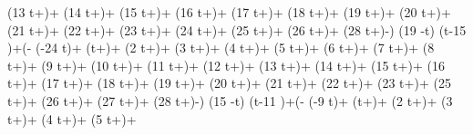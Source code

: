    \sin \left(13 t+\right)+ \sin \left(14
   t+\right)+ \sin \left(15 t+\right)+ \sin
   \left(16 t+\right)+ \sin \left(17
   t+\right)+ \sin \left(18 t+\right)+ \sin
   \left(19 t+\right)+ \sin \left(20 t+\right)+
   \sin \left(21 t+\right)+ \sin \left(22
   t+\right)+ \sin \left(23 t+\right)+ \sin \left(24
   t+\right)+ \sin \left(25 t+\right)+ \sin
   \left(26 t+\right)+ \sin \left(28
   t+\right)-\right) \theta (19 \pi -t) \theta (t-15 \pi
   )+\left(- \sin \left(-24 t\right)+ \sin
   \left(t+\right)+ \sin \left(2 t+\right)+
   \sin \left(3 t+\right)+ \sin \left(4
   t+\right)+ \sin \left(5 t+\right)+ \sin
   \left(6 t+\right)+ \sin \left(7 t+\right)+ \sin
   \left(8 t+\right)+ \sin \left(9 t+\right)+
   \sin \left(10 t+\right)+ \sin \left(11
   t+\right)+ \sin \left(12 t+\right)+ \sin
   \left(13 t+\right)+ \sin \left(14 t+\right)+
   \sin \left(15 t+\right)+ \sin \left(16
   t+\right)+ \sin \left(17 t+\right)+ \sin
   \left(18 t+\right)+ \sin \left(19 t+\right)+
   \sin \left(20 t+\right)+ \sin \left(21
   t+\right)+ \sin \left(22 t+\right)+ \sin
   \left(23 t+\right)+ \sin \left(25 t+\right)+
   \sin \left(26 t+\right)+ \sin \left(27
   t+\right)+ \sin \left(28 t+\right)-\right)
   \theta (15 \pi -t) \theta (t-11 \pi )+\left(- \sin \left(-9
   t\right)+ \sin \left(t+\right)+ \sin \left(2
   t+\right)+ \sin \left(3 t+\right)+ \sin
   \left(4 t+\right)+ \sin \left(5 t+\right)+ \sin

